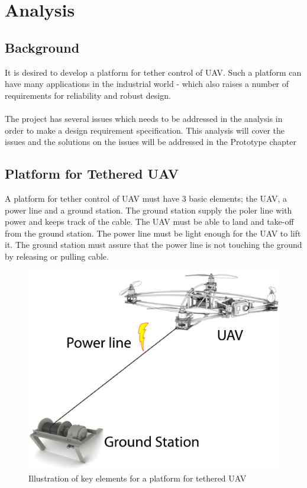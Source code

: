 
\chapter{Analysis}

\section{Background}
It is desired to develop a platform for tether control of UAV. Such a platform can have many applications in the industrial world - which also raises a number of requirements for reliability and robust design. \\
\\
The project has several issues which needs to be addressed in the analysis in order to make a design requirement specification. This analysis will cover the issues and the solutions on the issues will be addressed in the Prototype chapter 


\section{Platform for Tethered UAV}
A platform for tether control of UAV must have 3 basic elements; the UAV, a power line and a ground station. The ground station supply the poler line with power and keeps track of the cable. The UAV must be able to land and take-off from the ground station. The power line must be light enough for the UAV to lift it. The ground station must assure that the power line is not touching the ground by releasing or pulling cable.

\begin{figure}[H]
\centering
\includegraphics[scale=0.5]{graphics/overall-system.png}
\caption{Illustration of key elements for a platform for tethered UAV}
\end{figure}




